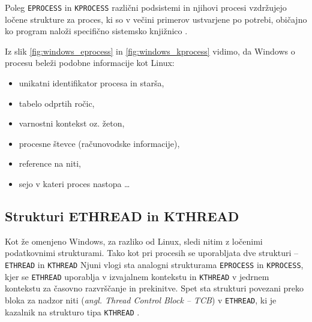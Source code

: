 \documentclass[a4paper,12pt,openright]{book}
\begin{document}
Poleg \texttt{EPROCESS} in \texttt{KPROCESS} različni podsistemi in njihovi procesi vzdržujejo ločene strukture za proces, ki so v večini primerov ustvarjene po potrebi, običajno ko program naloži specifično sistemsko knjižnico \cite{Yosifovich_Russinovich_Solomon_Ionescu_2017}.

Iz slik \ref{fig:windows_eprocess} in \ref{fig:windows_kprocess} vidimo, da Windows o procesu beleži podobne informacije kot Linux:
\begin{itemize}
	\item unikatni identifikator procesa in starša,
	\item tabelo odprtih ročic,
	\item varnostni kontekst oz. žeton,
	\item procesne števce (računovodske informacije),
	\item reference na niti,
	\item sejo v kateri proces nastopa \dots
\end{itemize}


\subsection{Strukturi ETHREAD in KTHREAD} \label{ssec:windows_process:ethread}

Kot že omenjeno Windows, za razliko od Linux, sledi nitim z ločenimi podatkovnimi strukturami.
Tako kot pri procesih se uporabljata dve strukturi -- \texttt{ETHREAD} in \texttt{KTHREAD} \cite{Yosifovich_Russinovich_Solomon_Ionescu_2017}
Njuni vlogi sta analogni strukturama \texttt{EPROCESS} in \texttt{KPROCESS}, kjer se \texttt{ETHREAD} uporablja v izvajalnem kontekstu in \texttt{KTHREAD} v jedrnem kontekstu za časovno razvrščanje in prekinitve.
Spet sta strukturi povezani preko bloka za nadzor niti (\textit{angl. Thread Control Block -- TCB}) v \texttt{ETHREAD}, ki je kazalnik na strukturo tipa \texttt{KTHREAD} \cite{Yosifovich_Russinovich_Solomon_Ionescu_2017}.
\end{document}
